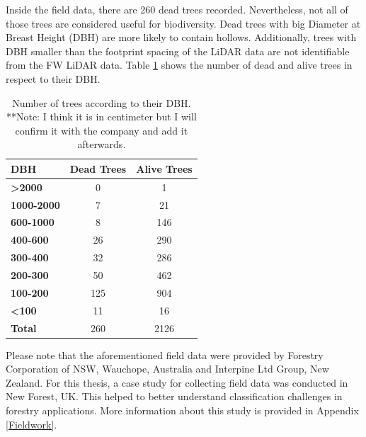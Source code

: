 \documentclass{subfiles}
\begin{document}
\par Inside the field data, there are 260 dead trees recorded. Nevertheless, not all of those trees are considered useful for biodiversity. Dead trees with big Diameter at Breast Height (DBH) are more likely to contain hollows. Additionally, trees with DBH smaller than the footprint spacing of the LiDAR data are not identifiable from the FW LiDAR data. Table \ref{tab:DBH} shows the number of dead and alive trees in respect to their DBH. 

\begin{table}[!h]
	\centering
	\begin{tabular}{| l || c | c | }
		\hline		
		\textbf{DBH} &\textbf{Dead Trees} & \textbf{Alive Trees }\\	
		\hline			
		\hline			
		\textbf{>2000} & 0 & 1\\
		\hline			
		\textbf{1000-2000} & 7 & 21\\
		\hline			
		\textbf{600-1000} & 8 & 146\\
		\hline			
		\textbf{400-600} & 26 & 290\\
		\hline			
		\textbf{300-400} & 32 & 286\\
		\hline			
		\textbf{200-300} & 50 & 462\\
		\hline			
		\textbf{100-200} &125 & 904\\
		\hline			
		\textbf{<100} & 11 & 16\\
		\hline			
		\textbf{Total} & 260 & 2126 \\
		
		
		
		
		\hline  
	\end{tabular}
	\caption{Number of trees according to their DBH. {\color{red}**Note: I think it is in centimeter but I will confirm it with the company and add it afterwards. }}
	\label{tab:DBH}
\end{table}

\par Please note that the aforementioned field data were provided by Forestry Corporation of NSW, Wauchope, Australia and Interpine Ltd Group, New Zealand. For this thesis, a case study for collecting field data was conducted in New Forest, UK. This helped to better understand classification challenges in forestry applications. More information about this study is provided in Appendix \ref{Fieldwork}.
\end{document}
